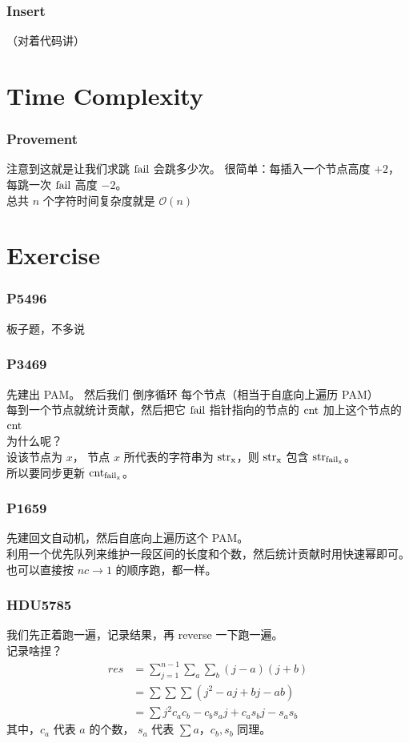 \documentclass{beamer}
\begin{document}
\begin{CJK}{UTF8}{gbsn}
	\begin{frame}
		\frametitle{Insert}
		（对着代码讲）
	\end{frame}
	
	\section{Time Complexity}
	\begin{frame}
		\frametitle{Provement}
		注意到这就是让我们求跳 $\rm fail$ 会跳多少次。  
		很简单：每插入一个节点高度 $+2$，每跳一次 $\rm fail$ 高度 $-2$。\\  
		总共 $n$ 个字符时间复杂度就是 $\mathcal{O}(n)$
	\end{frame}

	\section{Exercise}
	\begin{frame}
		\frametitle{P5496}
		板子题，不多说
	\end{frame}

	\begin{frame}
		\frametitle{P3469}
		先建出 PAM。  
		\pause
		然后我们 倒序循环 每个节点（相当于自底向上遍历 PAM）\\  
		每到一个节点就统计贡献，然后把它 $\rm fail$ 指针指向的节点的 $\rm cnt$ 加上这个节点的 $\rm cnt$\\
		为什么呢？\\  
		设该节点为 $x$， 节点 $x$ 所代表的字符串为 $\rm str_x$，则 $\rm str_x$ 包含 $\rm str_{fail_x}$。\\
		所以要同步更新 $\rm cnt_{fail_x}$。
	\end{frame}

	\begin{frame}
		\frametitle{P1659}
			先建回文自动机，然后自底向上遍历这个 PAM。  \\
			利用一个优先队列来维护一段区间的长度和个数，然后统计贡献时用快速幂即可。
			也可以直接按 $nc \rightarrow 1$ 的顺序跑，都一样。
		\end{frame}

	\begin{frame}
		\frametitle{HDU5785}
		我们先正着跑一遍，记录结果，再 reverse 一下跑一遍。  \\
		记录啥捏？  
		$$
		\begin{aligned}res&=\sum_{j=1}^{n-1}\sum_a\sum_b (j-a)(j+b)\\
			&=\sum\sum\sum (j^2-aj+bj-ab)\\
			&=\sum j^2c_ac_b-c_bs_aj+c_as_bj-s_as_b
		\end{aligned}
		$$
		其中，$c_a$ 代表 $a$ 的个数， $s_a$ 代表 $\sum a$，$c_b,s_b$ 同理。


\end{frame}
\end{CJK}
\end{document}
